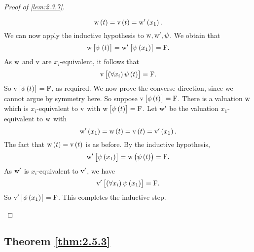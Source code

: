 \begin{proof}[Proof of \ref{lem:2.3.7}]
\begin{itemize}
\begin{enumerate}[leftmargin=0.5in, label=Case \arabic*.]
$$ \w\br{t} = \v\br{t} = \w'\br{x_1}. $$
We can now apply the inductive hypothesis to $ \mathrm{w}, \mathrm{w}', \psi $. We obtain that
$$ \w\sbr{\psi\br{t}} = \w'\sbr{\psi\br{x_1}} = \F. $$
As $ \mathrm{w} $ and $ \mathrm{v} $ are $ x_i $-equivalent, it follows that
$$ \v\sbr{\fab{x_i}\psi\br{t}} = \F. $$
So $ \v\sbr{\phi\br{t}} = \F $, as required. We now prove the converse direction, since we cannot argue by symmetry here. So suppose $ \v\sbr{\phi\br{t}} = \F $. There is a valuation $ \mathrm{w} $ which is $ x_i $-equivalent to $ \mathrm{v} $ with $ \w\sbr{\psi\br{t}} = \F $. Let $ \mathrm{w}' $ be the valuation $ x_1 $-equivalent to $ \mathrm{w} $ with
$$ \w'\br{x_1} = \w\br{t} = \v\br{t} = \v'\br{x_1}. $$
The fact that $ \w\br{t} = \v\br{t} $ is as before. By the inductive hypothesis,
$$ \w'\sbr{\psi\br{x_1}} = \w\br{\psi\br{t}} = \F. $$
As $ \mathrm{w}' $ is $ x_i $-equivalent to $ \mathrm{v}' $, we have
$$ \v'\sbr{\fab{x_i}\psi\br{x_1}} = \F. $$
So $ \v'\sbr{\phi\br{x_1}} = \F $. This completes the inductive step.
\end{enumerate}
\end{itemize}
\end{proof}

\pagebreak

\subsection{Theorem \ref{thm:2.5.3}}

